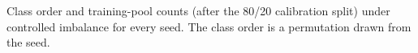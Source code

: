 \begin{table}[t]
  \centering
  \footnotesize
  \setlength{\tabcolsep}{3pt}
  
  \caption{Class order and training-pool counts (after the 80/20 calibration split) under controlled imbalance for every seed. The class order is a permutation drawn from the seed.}
  \label{tab:imbalance_counts}
\end{table}
